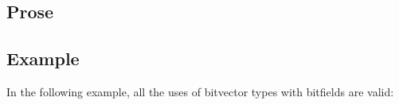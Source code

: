 \documentclass{book}
\begin{document}
\subsection{Prose}


\subsection{Example}
In the following example, all the uses of bitvector types with bitfields are valid:







\end{document}
